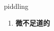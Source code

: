 
\begin{frame}
{\huge piddling}
\begin{center}
\begin{enumerate}\Large
  \item \textbf{微不足道的}
\end{enumerate}
\end{center}
\end{frame}
